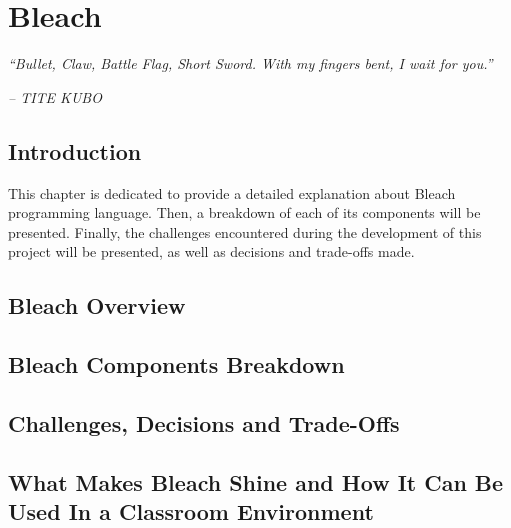 \chapter{Bleach} \label{cap:metodologia}

\begin{displayquote}
    \begin{center}
        \textit{``Bullet, Claw, Battle Flag, Short Sword. With my fingers bent, I wait for you.''}
    \end{center}
\end{displayquote}

\begin{flushright}
   \textit{-- TITE KUBO}
\end{flushright}

\section{Introduction}
This chapter is dedicated to provide a detailed explanation about  Bleach programming language.  Then, a breakdown of each of its components will be presented. Finally, the challenges encountered during the development of this project will be presented, as well as decisions and trade-offs made.

\section{Bleach Overview}

\section{Bleach Components Breakdown}

\section{Challenges, Decisions and Trade-Offs}

\section{What Makes Bleach Shine and How It Can Be Used In a Classroom Environment}